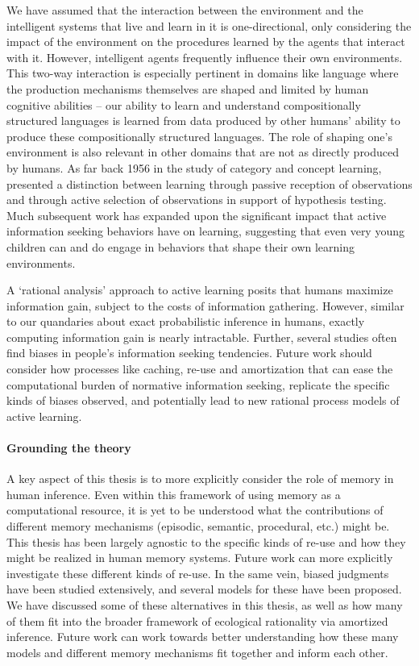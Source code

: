 We have assumed that the interaction between the environment and the intelligent systems that live and learn in it is one-directional, only considering the impact of the environment on the procedures learned by the agents that interact with it. However, intelligent agents frequently influence their own environments. This two-way interaction is especially pertinent in domains like language where the production mechanisms themselves are shaped and limited by human cognitive abilities -- our ability to learn and understand compositionally structured languages is learned from data produced by other humans' ability to produce these compositionally structured languages. The role of shaping one's environment is also relevant in other domains that are not as directly produced by humans. As far back 1956 in the study of category and concept learning, \citet{bruner2017study} presented a distinction between learning through passive reception of observations and through active selection of observations in support of hypothesis testing. Much subsequent work has expanded upon the significant impact that active information seeking behaviors have on learning\citep{nelson2005finding,markant2014better, gureckis2012self}, suggesting that even very young children can and do engage in behaviors that shape their own learning environments\citep{ruggeri2017toma, gopnik1996scientist, montessori1912montessori}. 

A `rational analysis' approach to active learning posits that humans maximize information gain, subject to the costs of information gathering. However, similar to our quandaries about exact probabilistic inference in humans, exactly computing information gain is nearly intractable. Further, several studies often find biases in people's information seeking tendencies\citep{jonas2001confirmation, beattie1988confirmation}. Future work should consider how processes like caching, re-use and amortization that can ease the computational burden of normative information seeking, replicate the specific kinds of biases observed, and potentially lead to new rational process models of active learning.

\paragraph{Grounding the theory}

A key aspect of this thesis is to more explicitly consider the role of memory in human inference. Even within this framework of using memory as a computational resource, it is yet to be understood what the contributions of different memory mechanisms (episodic, semantic, procedural, etc.) might be. This thesis has been largely agnostic to the specific kinds of re-use and how they might be realized in human memory systems. Future work can more explicitly investigate these different kinds of re-use. In the same vein, biased judgments have been studied extensively, and several models for these have been proposed. We have discussed some of these alternatives in this thesis, as well as how many of them fit into the broader framework of ecological rationality via amortized inference. Future work can work towards better understanding how these many models and different memory mechanisms fit together and inform each other.


